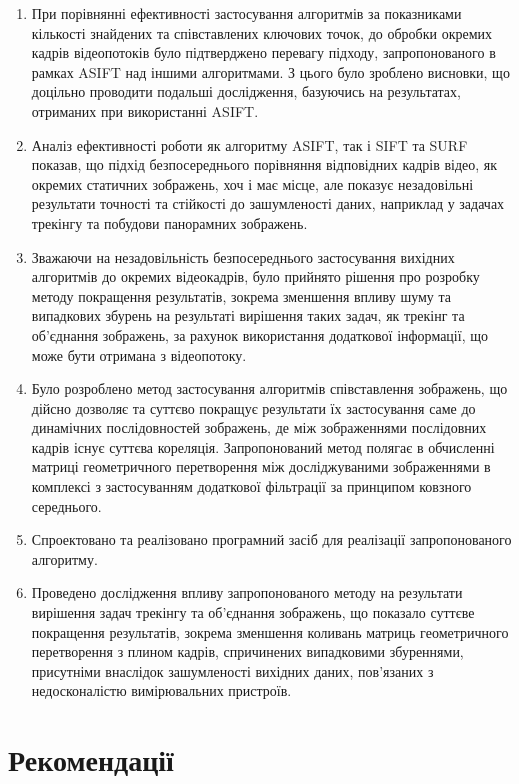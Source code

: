 \begin{enumerate}
\item При порівнянні ефективності застосування алгоритмів за показниками кількості знайдених та співставлених ключових точок, до обробки окремих кадрів відеопотоків було підтверджено перевагу підходу, запропонованого в рамках ASIFT над іншими алгоритмами. З цього було зроблено висновки, що доцільно проводити подальші дослідження, базуючись на результатах, отриманих при використанні ASIFT.
\item Аналіз ефективності роботи як алгоритму ASIFT, так і SIFT та SURF показав, що підхід безпосереднього порівняння відповідних кадрів відео, як окремих статичних зображень, хоч і має місце, але показує незадовільні результати точності та стійкості до зашумленості даних, наприклад у задачах трекінгу та побудови панорамних зображень.
\item Зважаючи на незадовільність безпосереднього застосування вихідних алгоритмів до окремих відеокадрів, було прийнято рішення про розробку методу покращення результатів, зокрема зменшення впливу шуму та випадкових збурень на результаті вирішення таких задач, як трекінг та об'єднання зображень, за рахунок використання додаткової інформації, що може бути отримана з відеопотоку.
\item Було розроблено метод застосування алгоритмів співставлення зображень, що дійсно дозволяє та суттєво покращує результати їх застосування саме до динамічних послідовностей зображень, де між зображеннями послідовних кадрів існує суттєва кореляція. Запропонований метод полягає в обчисленні матриці геометричного перетворення між досліджуваними зображеннями в комплексі з застосуванням додаткової фільтрації за принципом ковзного середнього. 
\item Спроектовано та реалізовано програмний засіб для реалізації запропонованого алгоритму. 
\item Проведено дослідження впливу запропонованого методу на результати вирішення задач трекінгу та об'єднання зображень, що показало суттєве покращення результатів, зокрема зменшення коливань матриць геометричного перетворення з плином кадрів, спричинених випадковими збуреннями, присутніми внаслідок зашумленості вихідних даних, пов'язаних з недосконалістю вимірювальних пристроїв.
\end{enumerate}

\chapter*{Рекомендації}

